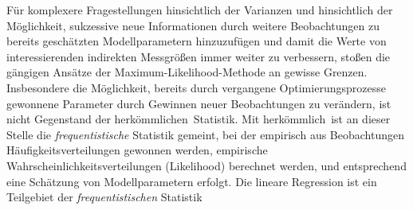 Für komplexere Fragestellungen hinsichtlich der Varianzen und hinsichtlich der Möglichkeit,
sukzessive neue Informationen durch weitere Beobachtungen zu bereits geschätzten Modellparametern
hinzuzufügen und damit die Werte von
interessierenden indirekten Messgrößen immer weiter zu verbessern, stoßen die gängigen Ansätze
der Maximum-Likelihood-Methode an gewisse Grenzen. Insbesondere die Möglichkeit, bereits durch
vergangene Optimierungsprozesse gewonnene Parameter durch Gewinnen neuer Beobachtungen zu verändern,
ist nicht Gegenstand der \glqq herkömmlichen\grqq ~Statistik. Mit \glqq herkömmlich\grqq ~ist
an dieser Stelle die \textsl{frequentistische} Statistik gemeint, bei der empirisch aus
Beobachtungen Häufigkeitsverteilungen gewonnen werden, empirische Wahrscheinlichkeitsverteilungen
(Likelihood) berechnet werden, und entsprechend eine Schätzung von Modellparametern erfolgt.
Die lineare Regression ist ein Teilgebiet der \textsl{frequentistischen} Statistik

